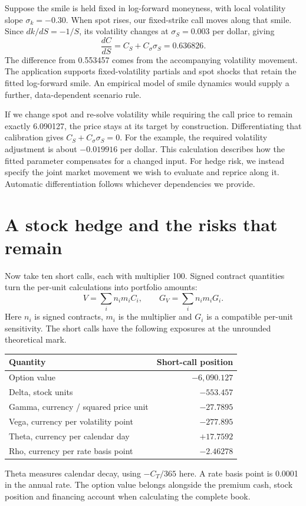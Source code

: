 \documentclass[8pt]{strategynet-journal}
\begin{document}
\begin{SNcolumns}
Suppose the smile is held fixed in log-forward moneyness, with local
volatility slope $\sigma_k=-0.30$. When spot rises, our fixed-strike call
moves along that smile. Since $dk/dS=-1/S$, its volatility changes at
$\sigma_S=0.003$ per dollar, giving
\[
 \frac{dC}{dS}=C_S+C_\sigma\sigma_S=0.636826.
\]
The difference from 0.553457 comes from the accompanying volatility movement.
The application supports fixed-volatility partials and spot shocks that retain
the fitted log-forward smile. An empirical model of smile dynamics would
supply a further, data-dependent scenario rule.

If we change spot and re-solve volatility while requiring the call price
to remain exactly 6.090127, the
price stays at its target by construction. Differentiating that calibration
gives $C_S+C_\sigma\sigma_S=0$. For the example, the required volatility
adjustment is about $-0.019916$ per dollar. This calculation describes how the
fitted parameter compensates for a changed input. For hedge risk, we instead
specify the joint market movement we wish to evaluate and reprice along it.
Automatic differentiation follows whichever dependencies we provide.

\section{A stock hedge and the risks that remain}
Now take ten short calls, each with multiplier 100. Signed contract quantities
turn the per-unit calculations into portfolio amounts:
\[
 V=\sum_i n_i m_i C_i,\qquad
 G_V=\sum_i n_i m_i G_i.
\]
Here $n_i$ is signed contracts, $m_i$ is the multiplier and $G_i$ is a compatible
per-unit sensitivity. The short calls have the following exposures at the
unrounded theoretical mark.
\begin{center}\normalsize
\begin{tabular}{lr}
\toprule
Quantity & Short-call position\\
\midrule
Option value&$-6{,}090.127$\\
Delta, stock units&$-553.457$\\
Gamma, currency / squared price unit&$-27.7895$\\
Vega, currency per volatility point&$-277.895$\\
Theta, currency per calendar day&$+17.7592$\\
Rho, currency per rate basis point&$-2.46278$\\
\bottomrule
\end{tabular}
\end{center}
Theta measures calendar decay, using $-C_T/365$ here. A rate basis point is
0.0001 in the annual rate. The option value belongs alongside the premium cash,
stock position and financing account when calculating the complete book.


\end{SNcolumns}
\end{document}

